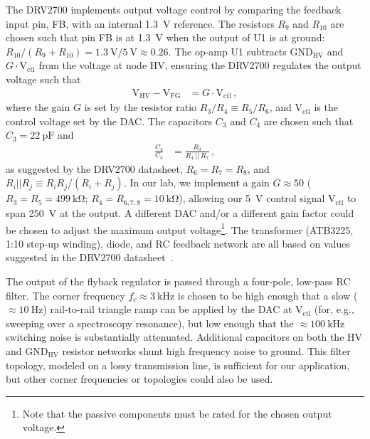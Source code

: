 \documentclass[aip,rsi,reprint]{revtex4-1} %
\begin{document}
The DRV2700 implements output voltage control by comparing the feedback input pin, FB, with an internal \SI{1.3}{\volt} reference.
The resistors $R_9$ and $R_{10}$ are chosen such that pin FB is at \SI{1.3}{\volt} when the output of U1 is at ground: $R_{10}/(R_9+R_{10}) = \SI{1.3}{\volt}/\SI{5}{\volt} \approx \num{0.26}$.
The op-amp U1 subtracts $\text{GND}_{\text{HV}}$ and $G\cdot \text{V}_\text{ctl}$ from the voltage at node HV, ensuring the DRV2700 regulates the output voltage such that
\begin{align}
\label{Eq:U1Output}
\text{V}_\text{HV} - \text{V}_{\text{FG}} &= G\cdot \text{V}_{\text{ctl}}\,,
\end{align}
where the gain $G$ is set by the resistor ratio $R_3/R_4 \equiv R_5/R_6$, and $\text{V}_\text{ctl}$ is the control voltage set by the DAC.
The capacitors $C_3$ and $C_4$ are chosen such that $C_3 = \SI{22}{\pico\farad}$ and
\begin{align}
\frac{C_4}{C_3} &= \frac{R_3}{R_4~||~R_7}\,,
\end{align}
as suggested by the DRV2700 datasheet\cite{DRV2700Datasheet}, $R_6 = R_7 = R_8$, and $R_i||R_j \equiv R_i R_j/(R_i + R_j)$.
In our lab, we implement a gain $G\approx 50$ ($R_3 = R_5 = \SI{499}{\kilo\ohm}$; $R_4 = R_{6,7,8} = \SI{10}{\kilo\ohm}$), allowing our \SI{5}{\volt} control signal $\text{V}_\text{ctl}$ to span \SI{250}{\volt} at the output. A different DAC and/or a different gain factor could be chosen to adjust the maximum output voltage\footnote{Note that the passive components must be rated for the chosen output voltage.}.
The transformer (ATB3225, 1:10 step-up winding), diode, and RC feedback network are all based on values suggested in the DRV2700 datasheet~\cite{DRV2700Datasheet,DRV2700EVMUserGuide}.

The output of the flyback regulator is passed through a four-pole, low-pass RC filter.
The corner frequency $f_c \approx \SI{3}{\kilo\hertz}$ is chosen to be high enough that a slow ($\approx \SI{10}{\hertz}$) rail-to-rail triangle ramp can be applied by the DAC at $\text{V}_\text{ctl}$ (for, e.g., sweeping over a spectroscopy resonance), but low enough that the $\approx \SI{100}{\kilo\hertz}$ switching noise is substantially attenuated.
Additional capacitors on both the HV and $\text{GND}_{\text{HV}}$ resistor networks shunt high frequency noise to ground.
This filter topology, modeled on a lossy transmission line, is sufficient for our application, but other corner frequencies or topologies could also be used.
\end{document}
